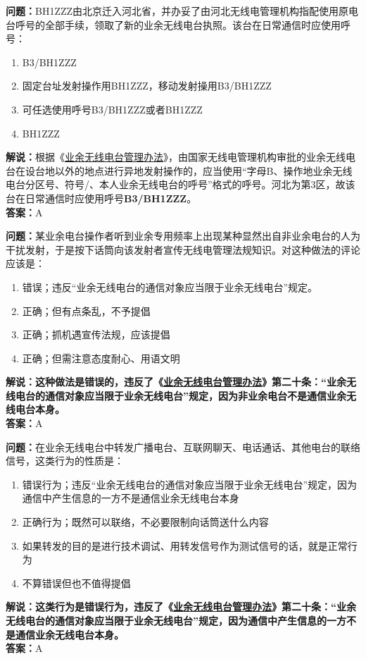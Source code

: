 \textbf{问题：}BH1ZZZ由北京迁入河北省，并办妥了由河北无线电管理机构指配使用原电台呼号的全部手续，领取了新的业余无线电台执照。该台在日常通信时应使用呼号：
\begin{enumerate}[label=\Alph*), leftmargin=1cm]
	\item B3/BH1ZZZ
	\item 固定台址发射操作用BH1ZZZ，移动发射操用B3/BH1ZZZ
	\item 可任选使用呼号B3/BH1ZZZ或者BH1ZZZ
	\item BH1ZZZ
\end{enumerate}
\textbf{解说：}根据《\href{https://www.miit.gov.cn/jgsj/zfs/bmgz/art/2020/art_147b69815b3641caad9047735f94c860.html}{业余无线电台管理办法}》，由国家无线电管理机构审批的业余无线电台在设台地以外的地点进行异地发射操作的，应当使用“字母B、操作地业余无线电台分区号、符号/、本人业余无线电台的呼号”格式的呼号。河北为第3区，故该台在日常通信时应使用呼号\textbf{B3/BH1ZZZ}。\\\textbf{答案：}A

\textbf{问题：}某业余电台操作者听到业余专用频率上出现某种显然出自非业余电台的人为干扰发射，于是按下话筒向该发射者宣传无线电管理法规知识。对这种做法的评论应该是：
\begin{enumerate}[label=\Alph*), leftmargin=1cm]
	\item 错误；违反“业余无线电台的通信对象应当限于业余无线电台”规定。
	\item 正确；但有点条乱，不予提倡
	\item 正确；抓机遇宣传法规，应该提倡
	\item 正确；但需注意态度耐心、用语文明
\end{enumerate}
\textbf{解说：这种做法是错误的，违反了《\href{https://www.miit.gov.cn/jgsj/zfs/bmgz/art/2020/art_147b69815b3641caad9047735f94c860.html}{业余无线电台管理办法}》第二十条：“业余无线电台的通信对象应当限于业余无线电台”规定，因为非业余电台不是通信业余无线电台本身。}\\\textbf{答案：}A

\textbf{问题：}在业余无线电台中转发广播电台、互联网聊天、电话通话、其他电台的联络信号，这类行为的性质是：
\begin{enumerate}[label=\Alph*), leftmargin=1cm]
	\item 错误行为；违反“业余无线电台的通信对象应当限于业余无线电台”规定，因为通信中产生信息的一方不是通信业余无线电台本身
	\item 正确行为；既然可以联络，不必要限制向话筒送什么内容
	\item 如果转发的目的是进行技术调试、用转发信号作为测试信号的话，就是正常行为
	\item 不算错误但也不值得提倡
\end{enumerate}
\textbf{解说：这类行为是错误行为，违反了《\href{https://www.miit.gov.cn/jgsj/zfs/bmgz/art/2020/art_147b69815b3641caad9047735f94c860.html}{业余无线电台管理办法}》第二十条：“业余无线电台的通信对象应当限于业余无线电台”规定，因为通信中产生信息的一方不是通信业余无线电台本身。}\\\textbf{答案：}A

